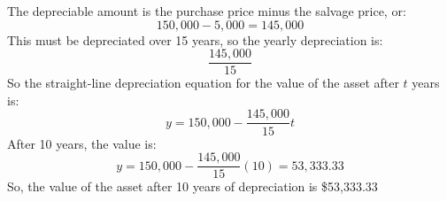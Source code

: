 \documentclass[letterpaper,12pt,fleqn]{article}
\begin{document}
\begin{enumerate}
  The depreciable amount is the purchase price minus the salvage price, or:
  \[150,000-5,000=145,000\]
  This must be depreciated over 15 years, so the yearly depreciation is:
  \[\frac{145,000}{15}\]
  So the straight-line depreciation equation for the value of the asset after
  $t$ years is:
  \[y=150,000-\frac{145,000}{15}t\]
  After 10 years, the value is:
  \[y=150,000-\frac{145,000}{15}(10)=53,333.33\]
  So, the value of the asset after 10 years of depreciation is \$53,333.33
\end{enumerate}
\end{document}

